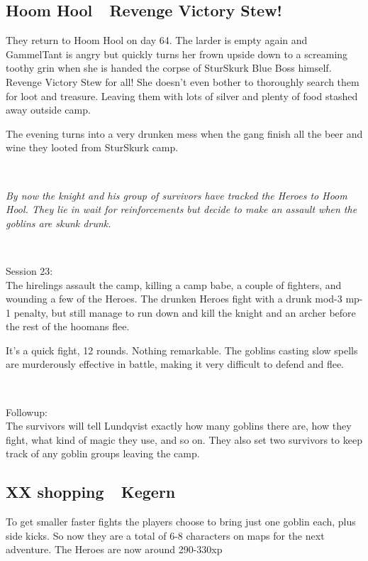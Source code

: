 \subsection*{Hoom Hool~\mdash~Revenge Victory Stew!}

They return to Hoom Hool on day 64. The larder is empty again and GammelTant is angry but quickly turns her frown upside down to a screaming toothy grin when she is handed the corpse of SturSkurk Blue Boss himself. Revenge Victory Stew for all! She doesn't even bother to thoroughly search them for loot and treasure. Leaving them with lots of silver and plenty of food stashed away outside camp.

The evening turns into a very drunken mess when the gang finish all the beer and wine they looted from SturSkurk camp.

\

\textit{By now the knight and his group of survivors have tracked the Heroes to Hoom Hool. They lie in wait for reinforcements but decide to make an assault when the goblins are skunk drunk.}

\

Session 23:\\                                                           %
The hirelings assault the camp, killing a camp babe, a couple of fighters, and wounding a few of the Heroes. The drunken Heroes fight with a drunk mod-3 mp-1 penalty, but still manage to run down and kill the knight and an archer before the rest of the hoomans flee. 

It's a quick fight, 12 rounds. Nothing remarkable. The goblins casting slow spells are murderously effective in battle, making it very difficult to defend and flee.

\

Followup:\\
The survivors will tell Lundqvist exactly how many goblins there are, how they fight, what kind of magic they use, and so on. They also set two survivors to keep track of any goblin groups leaving the camp.


\subsection*{XX shopping~\mdash~Kegern}

\begin{readoutloud}
To get smaller faster fights the players choose to bring just one goblin each, plus side kicks. So now they are a total of 6-8 characters on maps for the next adventure. The Heroes are now around 290-330xp
\end{readoutloud}

